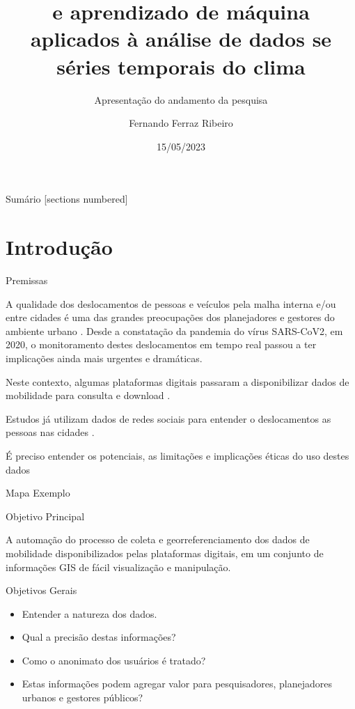 \documentclass[10pt]{beamer}
\title{\dmc e aprendizado de máquina aplicados à análise de dados se séries temporais do clima}
\subtitle{Apresentação do andamento da pesquisa}
\date{15/05/2023}
\author{Fernando Ferraz Ribeiro}
\institute{UEFS PPGM}
\begin{document}
\maketitle

\begin{frame}{Sumário}
  [sections numbered]
  \tableofcontents[hideallsubsections]
\end{frame}

\section{Introdução}

\begin{frame}[fragile]{Premissas}

  A qualidade dos deslocamentos de pessoas e veículos pela malha interna e/ou entre cidades é uma das grandes preocupações dos planejadores e gestores do ambiente urbano \cite{Bermudez-Edo2018}. Desde a constatação da pandemia do vírus SARS-CoV2, em 2020, o monitoramento destes deslocamentos em tempo real passou a ter implicações ainda mais urgentes e dramáticas.

  Neste contexto, algumas plataformas digitais passaram a disponibilizar dados de mobilidade para consulta e download \cite{Oh2021,Tyrovolas2021,Szocska2021}.

  Estudos já utilizam dados de redes sociais para entender o deslocamentos as pessoas nas cidades \cite{Tejaswin2015,Chaturvedi2020,Milusheva2021}.
  
  É preciso entender os potenciais, as limitações e implicações éticas do uso destes dados
  
\end{frame}

\begin{frame}{Mapa Exemplo}


  
\end{frame}

\begin{frame}{Objetivo Principal}

A automação do processo de coleta e georreferenciamento  dos dados de mobilidade disponibilizados pelas plataformas digitais, em um conjunto de informações GIS de fácil visualização e manipulação.

  
\end{frame}

\begin{frame}{Objetivos Gerais}


  \begin{itemize}
		\item Entender a natureza dos dados.
		\item Qual a precisão destas informações?
		\item Como o anonimato dos usuários é tratado?
		\item Estas informações podem agregar valor para pesquisadores, planejadores urbanos e gestores públicos?
	\end{itemize}

\end{frame}
\end{document}
